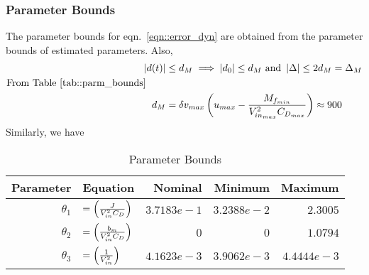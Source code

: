 \subsubsection{Parameter Bounds}
The parameter bounds for eqn.~\ref{eqn::error_dyn} are obtained from the
parameter bounds of estimated parameters. Also,
\begin{align*}
    \left\lvert d(t) \right\rvert &\leq d_M \implies \left\lvert d_0 \right\rvert \leq d_M \text{  and  } \left\lvert \Delta \right\rvert \leq 2d_M = \Delta_M\\
    \text{From Table~\ref{tab::parm_bounds}} \qquad &\\
    d_M &= \delta v_{max} \left( u_{max} - \frac{M_{f_{min}}}{V_{in_{max}}^2 C_{D_{max}}} \right) \approx 900
\end{align*}
Similarly, we have
\begin{table}[H]
    \centering
    \begin{tabular}{r l r r r}
        \hline \hline
        Parameter & Equation & Nominal & Minimum & Maximum\\ \hline \hline
        $\theta_1$ &
        $= \left( \frac{J}{V_{in}^2 C_D} \right)$ &
        $3.7183e-1$ &
        $3.2388e-2$ &
        $2.3005$
        \\
        $\theta_2$ &
        $= \left( \frac{b_m}{V_{in}^2 C_D} \right)$ &
        $0$ &
        $0$ &
        $1.0794$
        \\
        $\theta_3$ &
        $= \left( \frac{1}{V_{in}^2} \right)$ &
        $4.1623e-3$ &
        $3.9062e-3$ &
        $4.4444e-3$
        \\
        \hline \hline
    \end{tabular}
    \caption{Parameter Bounds}
    \label{tab::parm_lims}
\end{table}




